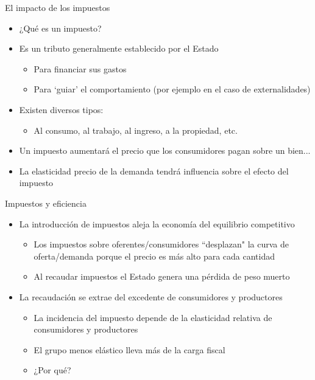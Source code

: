 \documentclass{beamer}
\begin{document}
\begin{frame}{El impacto de los impuestos}
    \begin{itemize}
        \item ¿Qué es un impuesto?
        \item Es un tributo generalmente establecido por el Estado
        \begin{itemize}
            \item Para financiar sus gastos
            \item Para ‘guiar’ el comportamiento (por ejemplo en el caso de externalidades)
        \end{itemize}
        \item Existen diversos tipos:
        \begin{itemize}
            \item Al consumo, al trabajo, al ingreso, a la propiedad, etc.
        \end{itemize}
        \item Un impuesto aumentará el precio que los consumidores pagan sobre un bien...
        \item La elasticidad precio de la demanda tendrá influencia sobre el efecto del impuesto
    \end{itemize}
\end{frame}

\begin{frame}{Impuestos y eficiencia}
    \begin{itemize}
        \item La introducción de impuestos aleja la economía del equilibrio competitivo
        \begin{itemize}
            \item Los impuestos sobre oferentes/consumidores ``desplazan" la curva de oferta/demanda porque el precio es más alto para cada cantidad
            \item Al recaudar impuestos el Estado genera una pérdida de peso muerto
        \end{itemize}
        \item La recaudación se extrae del excedente de consumidores y productores
        \begin{itemize}
            \item La incidencia del impuesto depende de la elasticidad relativa de consumidores y productores
            \item El grupo menos elástico lleva más de la carga fiscal
            \item ¿Por qué?
        \end{itemize}
    \end{itemize}
\end{frame}
\end{document}
